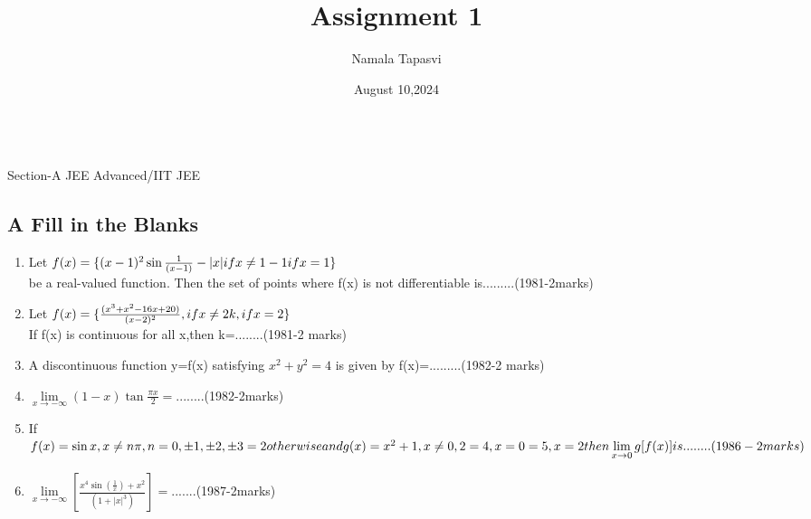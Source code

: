 \documentclass{article}
\title{Assignment 1}
\author{Namala Tapasvi}
\date{August 10,2024}
\begin{document}
\\

Section-A JEE Advanced/IIT JEE\\

\begin{multicols}{2}

\section*{A  Fill in the Blanks}
\begin{enumerate}
    \item  Let $f(x)=\{(x-1)^2\sin\frac{1}{(x-1)}-|x|  if x\neq1 \\ -1 if x=1\}$\\ be a real-valued function. Then the set of points where f(x) is not differentiable is.........\hfill (1981-2marks)\\ 

    \item Let $f(x)=\{\frac{(x^3+x^2-16x+20)}{(x-2)^2}, if x\neq2\\ k, if x=2\}$\\If f(x) is continuous for all x,then k=........\hfill (1981-2 marks)\\

    \item A discontinuous function y=f(x) satisfying $x^2+y^2=4$ is given by f(x)=.........\hfill (1982-2 marks)\\

    \item $\lim \limits_{x \to -\infty}(1-x)\tan\frac{\pi x}{2}=........$\hfill (1982-2marks)\\

    \item If $f(x)=\sin x,x\neq n\pi,n=0,\pm 1,\pm 2,\pm 3\\=2 otherwise \\ and g(x)=x^2+1,x\neq0,2\\=4,x=0\\=5,x=2\\ then \lim \limits_{x \to 0}g[f(x)] is........ \hfill (1986-2marks)$\\

    \item $\lim \limits_{x \to -\infty} [\frac{x^4 \sin (\frac{1}{x})+x^2}{(1+|x|^3)}]=.......$\hfill     (1987-2marks)\\


\end{enumerate}
\end{multicols}
\end{document}
